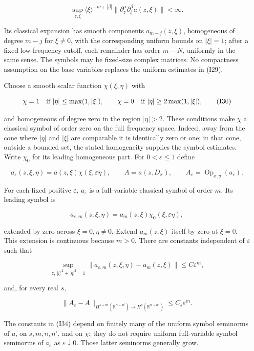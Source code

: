 \documentclass[
  11pt,
]{article}
\begin{document}
\[
 \sup_{z,\xi}\langle\xi\rangle^{-m+|\beta|}
       \|\partial_z^\alpha\partial_\xi^\beta a(z,\xi)\|<\infty.
 \tag{I29}
\]

Its classical expansion has smooth components \(a_{m-j}(z,\xi)\),
homogeneous of degree \(m-j\) for \(\xi\ne0\), with the corresponding
uniform bounds on \(|\xi|=1\); after a fixed low-frequency cutoff, each
remainder has order \(m-N\), uniformly in the same sense. The symbols
may be fixed-size complex matrices. No compactness assumption on the
base variables replaces the uniform estimates in (I29).

Choose a smooth scalar function \(\chi(\xi,\eta)\) with

\[
 \chi=1\quad\hbox{if }|\eta|\leq\max(1,|\xi|),\qquad
 \chi=0\quad\hbox{if }|\eta|\geq2\max(1,|\xi|),
 \tag{I30}
\]

and homogeneous of degree zero in the region \(|\eta|>2\). These
conditions make \(\chi\) a classical symbol of order zero on the full
frequency space. Indeed, away from the cone where \(|\eta|\) and
\(|\xi|\) are comparable it is identically zero or one; in that cone,
outside a bounded set, the stated homogeneity supplies the symbol
estimates. Write \(\chi_0\) for its leading homogeneous part. For
\(0<\varepsilon\leq1\) define

\[
 a_\varepsilon(z,\xi,\eta)
       =a(z,\xi)\chi(\xi,\varepsilon\eta),\qquad
 A=a(z,D_x),\qquad A_\varepsilon=\operatorname{Op}_{x,y}(a_\varepsilon).
 \tag{I31}
\]

For each fixed positive \(\varepsilon\), \(a_\varepsilon\) is a
full-variable classical symbol of order \(m\). Its leading symbol is

\[
 a_{\varepsilon,m}(z,\xi,\eta)
     =a_m(z,\xi)\chi_0(\xi,\varepsilon\eta),
 \tag{I32}
\]

extended by zero across \(\xi=0,\eta\ne0\). Extend \(a_m(z,\xi)\) itself
by zero at \(\xi=0\). This extension is continuous because \(m>0\).
There are constants independent of \(\varepsilon\) such that

\[
 \sup_{z,\,|\xi|^2+|\eta|^2=1}
   \|a_{\varepsilon,m}(z,\xi,\eta)-a_m(z,\xi)\|
       \leq C\varepsilon^m,
 \tag{I33}
\]

and, for every real \(s\),

\[
 \|A_\varepsilon-A\|_{H^{s+m}(\mathbb R^{n+n'})\to
                          H^s(\mathbb R^{n+n'})}
       \leq C_s\varepsilon^m.
 \tag{I34}
\]

The constants in (I34) depend on finitely many of the uniform symbol
seminorms of \(a\), on \(s,m,n,n'\), and on \(\chi\); they do not
require uniform full-variable symbol seminorms of \(a_\varepsilon\) as
\(\varepsilon\downarrow0\). Those latter seminorms generally grow.
\end{document}
